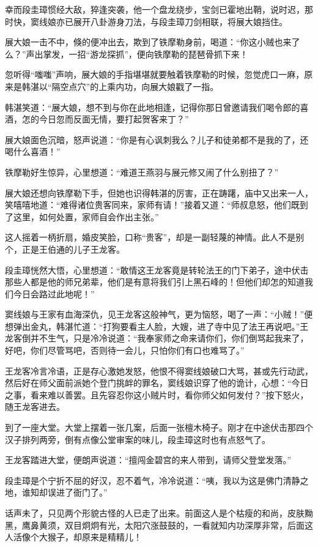 \documentclass[12pt,oneside]{book}
\begin{document}
幸而段圭璋惯经大敌，猝逢突袭，他一个盘龙绕步，宝剑已霍地出鞘，说时迟，那时快，窦线娘亦已展开八卦游身刀法，与段圭璋刀剑相联，将展大娘挡住。

展大娘一击不中，倏的便冲出去，欺到了铁摩勒身前，喝道：``你这小贼也来了么？''声出掌发，一招``游龙探抓''，便向铁摩勒的琵琶骨抓下来！

忽听得``嗤嗤''声响，展大娘的手指堪堪就要触着铁摩勒的时候，忽觉虎口一麻，原来是韩湛以``隔空点穴''的上乘内功，向展大娘戳了一指。

韩湛笑道：``展大娘，想不到与你在此地相逢，记得你那日曾邀请我们喝令郎的喜酒，怎的今日忽而反面无情，要打起贺客来丁？''

展大娘面色沉暗，怒声说道：``你是有心讽刺我么？儿子和徒弟都不是我的了，还喝什么喜酒！''

铁摩勒好生惊异，心里想道：``难道王燕羽与展元修又闹了什么别扭了？''

展大娘还想向铁摩勒下手，但她也识得韩湛的厉害，正在踌躇，庙中又出来一人，笑嘻嘻地道：``难得诸位贵客同来，家师有请！''接着又道：``师叔息怒，他们既到了这里，如何处置，家师自会作出主张。''

这人摇着一柄折扇，婚皮笑脸，口称``贵客''，却是一副轻蔑的神情。此人不是别个，正是王伯通的儿子王龙客。

段圭璋恍然大悟，心里想道：``敢情这王龙客竟是转轮法王的门下弟子，途中伏击那些人都是他的师兄弟辈，他们是有意将我们引上黑石峰的！但他们却怎的知道我们今日会路过此地呢！''

窦线娘与王家有血海深仇，见王龙客这般神气，更为恼怒，喝了一声：``小贼！''便想弹出金丸，韩湛忙道：``打狗要看主人脸，大嫂，进了寺中见了法王再说吧。''王龙客倒并不生气，只是冷冷说道：``我奉家师之命来请你们，你们倒骂起我来了，好吧，你们尽管骂吧，否则待一会儿，只怕你们有口也难骂了。''

王龙客冷言冷语，正是存心激她发怒，他恨不得窦线娘破口大骂，甚或先行动武，然后好在师父面前派她个登门挑衅的罪名，窦线娘识穿了他的诡计，心想：``今日之事，看来难以善罢。且先容忍你这小贼片时，看你师父如何发付？''按下怒火，随王龙客进去。

到了一座大堂。大堂上摆着一张几案，后面一张檀木椅子。刚才在中途伏击那四个汉子排列两旁，倒有点像公堂审案的味儿，段圭璋这时也有点怒气了。

王龙客踏进大堂，便朗声说道：``擅闯金碧宫的来人带到，请师父登堂发落。''

段圭璋是个宁折不屈的好汉，忍不着气，冷冷说道：``咦，我以为这是佛门清静之地，谁知却误进了衙门了。''

话声未了，只见两个形貌古怪的人已走了出来。前面这人是个枯瘦的和尚，皮肤黝黑，鹰鼻黄须，双目炯炯有光，太阳穴涨鼓鼓的，一看就知内功深厚非常，后面这人活像个大猴子，却原来是精精儿！
\end{document}
